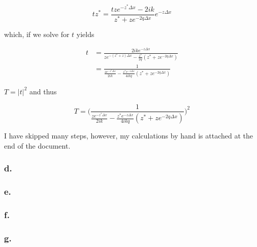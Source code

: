 \documentclass{article}
\begin{document}
\begin{equation}
tz^* = \frac{tze^{-z^*\Delta x} - 2ik}{z^* + ze^{-2q\Delta x}}e^{-z\Delta x}
\end{equation}

which, if we solve for $t$ yields

\begin{align}
t &= \frac{2ike^{-z\Delta x}}{ze^{-(z^* + z)\Delta x} - \frac{z^*}{2q}(z^*+ze^{-2q\Delta x})} \\
  &= \frac{1}{\frac{ze^{-z^*\Delta x}}{2ik} - \frac{z^*e^{-z\Delta x}}{4ikq}(z^* + ze^{-2q\Delta x})}
\end{align}

$T = |t|^2$ and thus

\begin{equation}
T = \bigg( \frac{1}{\frac{ze^{-z^*\Delta x}}{2ik} - \frac{z^*e^{-z\Delta x}}{4ikq}(z^* + ze^{-2q\Delta x})} \bigg)^2
\end{equation}

I have skipped many steps, however, my calculations by hand is attached at the end of the document.

\subsubsection*{d.}



\subsubsection*{e.}

\subsubsection*{f.}



\subsubsection*{g.}
\end{document}

